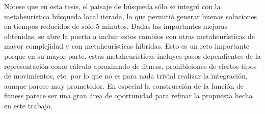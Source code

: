 
Nótese que en esta tesis, el paisaje de búsqueda sólo se integró con la metaheurística búsqueda local iterada, lo que permitió generar buenas soluciones en tiempos reducidos de solo 5 minutos. Dadas las importantes mejoras obtenidas, se abre la puerta a incluir estos cambios con otras metaheurísticas de mayor complejidad y con metaheurísticas híbridas. Esto es un reto importante porque en su mayor parte, estas metaheurísticas incluyes pasos dependientes de la representación como cálculo aproximado de fitness, prohibiciones de ciertos tipos de movimientos, etc. por lo que no es para nada trivial realizar la integración, aunque parece muy prometedor. En especial la construcción de la función de fitness parece ser una gran área de oportunidad para refinar la propuesta hecha en este trabajo.

